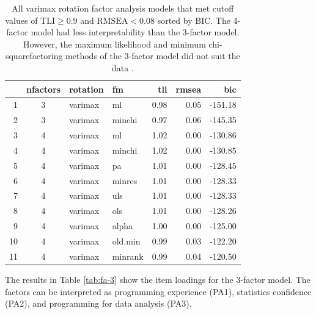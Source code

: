 \documentclass[020-persona\_validation.tex]{subfiles}
\begin{document}
        \begin{table}[!hbtp]
            \centering
            \caption[Factoring methods for all factor methods]
            {
                All varimax rotation factor analysis models that met cutoff values of
                $\text{TLI} \ge 0.9$ and $\text{RMSEA} < 0.08$ sorted by BIC.
                The 4-factor model had less interpretability than the 3-factor model.
                However, the maximum likelihood and minimum chi-squarefactoring methods of the
                3-factor model did not suit the data
                \cite{arifinExploratoryFactorAnalysis2017, brownConfirmatoryFactorAnalysis2015}.
            }
            \begin{tabular}{rcllrrr}
                \hline
               & nfactors & rotation & fm & tli & rmsea & bic \\
                \hline
                1 &   3 & varimax & ml & 0.98 & 0.05 & -151.18 \\
                2 &   3 & varimax & minchi & 0.97 & 0.06 & -145.35 \\
                3 &   4 & varimax & ml & 1.02 & 0.00 & -130.86 \\
                4 &   4 & varimax & minchi & 1.02 & 0.00 & -130.85 \\
                5 &   4 & varimax & pa & 1.01 & 0.00 & -128.45 \\
                6 &   4 & varimax & minres & 1.01 & 0.00 & -128.33 \\
                7 &   4 & varimax & uls & 1.01 & 0.00 & -128.33 \\
                8 &   4 & varimax & ols & 1.01 & 0.00 & -128.26 \\
                9 &   4 & varimax & alpha & 1.00 & 0.00 & -125.00 \\
                10 &   4 & varimax & old.min & 0.99 & 0.03 & -122.20 \\
                11 &   4 & varimax & minrank & 0.99 & 0.04 & -120.50 \\
                 \hline
              \end{tabular}
            \label{tab:all-good-varimax-models} %
        \end{table}

        The results in Table \ref{tab:fa-3} show the item loadings for the 3-factor model.
        The factors can be interpreted as
        programming experience (PA1),
        statistics confidence (PA2), and
        programming for data analysis (PA3).
\end{document}
